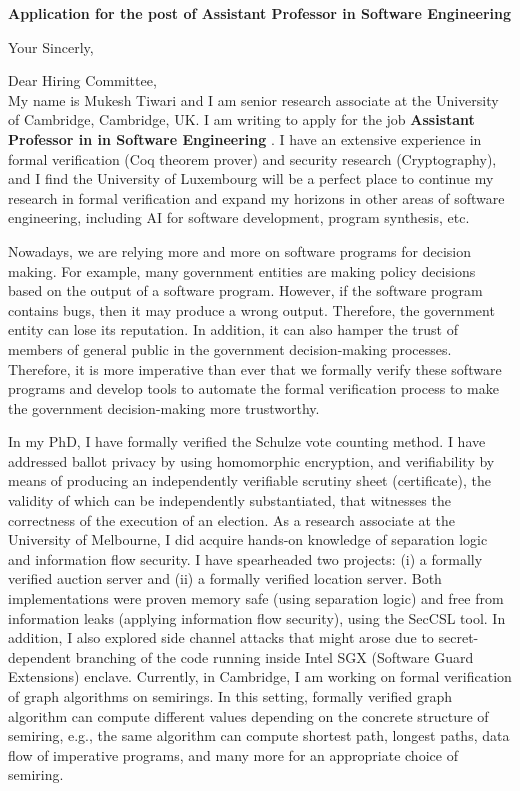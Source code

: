 \documentclass[11pt,a4paper,roman]{moderncv}
\begin{document}
\date{}
\opening{\textbf{Application for the post of Assistant Professor in Software Engineering }}
\closing{Your Sincerly, \vspace{-1em}}



\makelettertitle


Dear Hiring Committee, 
\\
\vspace{1em}
My name is Mukesh Tiwari and  I am senior research associate at 
the University of Cambridge, Cambridge, UK. 
I am writing to apply
for the job \textbf{Assistant Professor in in Software Engineering }. 
I have an extensive experience in
formal verification (Coq theorem prover) and security research (Cryptography), and 
I find the 
University of Luxembourg will be  
a perfect place to continue my research in formal verification and expand my horizons in other areas of
software engineering, including AI for software development, program 
synthesis, etc. 


\vspace{0.5cm}
Nowadays, we are relying more and more on software programs for decision making. 
For example, many government entities are making policy decisions based on the 
output of a software program. However, if the software program 
contains bugs, then it may produce a wrong output. Therefore, the government entity 
can lose its reputation. In addition, it can also hamper 
the trust of members of general public in the government decision-making processes. 
Therefore, it is more imperative than ever that we formally verify these software programs 
and develop tools to automate the formal verification process to make the government 
decision-making more trustworthy. 


In my PhD, I have formally verified the Schulze vote counting method. I have addressed ballot privacy by using 
homomorphic encryption, and verifiability by means of producing an independently verifiable scrutiny 
sheet (certificate), the validity of which can be independently substantiated, that witnesses the 
correctness of the execution of an election.  As a research associate at the University of Melbourne, 
I did acquire hands-on knowledge of separation logic and information flow security. I have spearheaded 
two projects: (i) a formally verified auction server and (ii) a formally verified location server. 
Both implementations were proven memory safe (using separation logic) and free from information 
leaks (applying information flow security), using the SecCSL tool. In addition, I also explored side 
channel attacks that might arose due to secret-dependent branching of the code running inside
Intel SGX (Software Guard Extensions) enclave. Currently, in Cambridge, I am working on 
formal verification of graph algorithms on semirings. In this setting, formally verified graph
 algorithm can compute different values depending on the concrete structure of semiring, e.g., the 
 same algorithm can compute shortest path, longest paths, data flow of imperative 
 programs, and many more for an appropriate choice of semiring.
\end{document}
